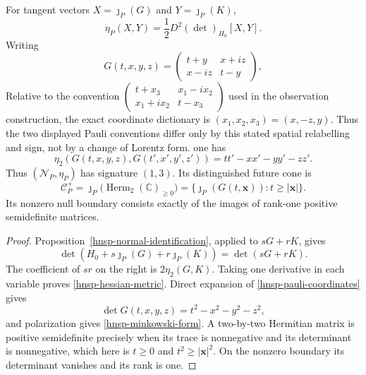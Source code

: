 \begin{theorem}
\label{hnsp-lorentz-theorem}
For tangent vectors \(X=\jmath_P(G)\) and \(Y=\jmath_P(K)\),
\begin{equation}
 \eta_P(X,Y)=\frac12D^2(\det)_{H_0}[X,Y].
 \label{hnsp-hessian-metric}
\end{equation}
Writing
\begin{equation}
 G(t,x,y,z)=
 \begin{pmatrix}t+y&x+iz\\x-iz&t-y\end{pmatrix},
 \label{hnsp-pauli-coordinates}
\end{equation}
Relative to the convention
\(
 \left(\begin{smallmatrix}
 t+x_3&x_1-i x_2\\ x_1+i x_2&t-x_3
 \end{smallmatrix}\right)
\)
used in the observation construction, the exact coordinate dictionary is
\((x_1,x_2,x_3)=(x,-z,y)\).  Thus the two displayed Pauli conventions differ
only by this stated spatial relabelling and sign, not by a change of Lorentz
form.
one has
\begin{equation}
 \eta_2(G(t,x,y,z),G(t',x',y',z'))
 =tt'-xx'-yy'-zz'.
 \label{hnsp-minkowski-form}
\end{equation}
Thus \((\mathcal N_P,\eta_P)\) has signature \((1,3)\).  Its distinguished
future cone is
\begin{equation}
 \mathcal C_P^+=\jmath_P\bigl(\operatorname{Herm}_2(\mathbb C)_{\geq0}\bigr)
 =\{\jmath_P(G(t,\mathbf x)):t\geq|\mathbf x|\}.
 \label{hnsp-future-cone}
\end{equation}
Its nonzero null boundary consists exactly of the images of rank-one positive
semidefinite matrices.
\end{theorem}

\begin{proof}
Proposition~\ref{hnsp-normal-identification}, applied to \(sG+rK\), gives
\[
 \det(H_0+s\jmath_P(G)+r\jmath_P(K))=\det(sG+rK).
\]
The coefficient of \(sr\) on the right is \(2\eta_2(G,K)\).  Taking one
derivative in each variable proves \eqref{hnsp-hessian-metric}.  Direct
expansion of \eqref{hnsp-pauli-coordinates} gives
\[
 \det G(t,x,y,z)=t^2-x^2-y^2-z^2,
\]
and polarization gives \eqref{hnsp-minkowski-form}.  A two-by-two Hermitian
matrix is positive semidefinite precisely when its trace is nonnegative and
its determinant is nonnegative, which here is
\(t\geq0\) and \(t^2\geq|\mathbf x|^2\).  On the nonzero boundary its
determinant vanishes and its rank is one.
\end{proof}

